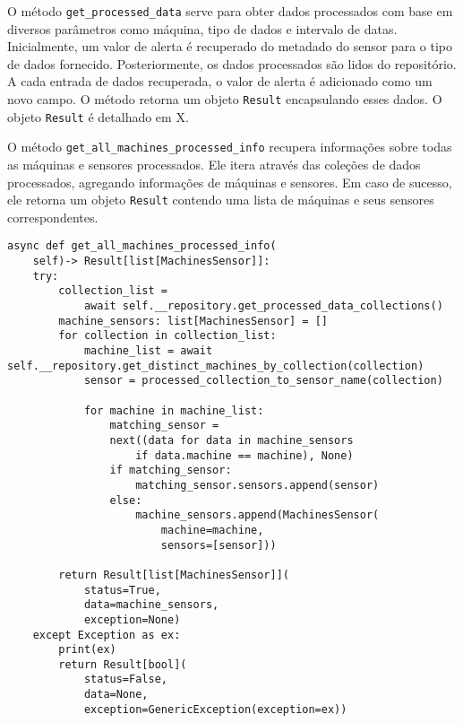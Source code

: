 O método \texttt{get\_processed\_data} serve para obter dados processados com base em diversos parâmetros como máquina, tipo de dados e intervalo de datas. Inicialmente, um valor de alerta é recuperado do metadado do sensor para o tipo de dados fornecido. Posteriormente, os dados processados são lidos do repositório. A cada entrada de dados recuperada, o valor de alerta é adicionado como um novo campo. O método retorna um objeto \texttt{Result} encapsulando esses dados. O objeto \texttt{Result} é detalhado em X. %

O método \texttt{get\_all\_machines\_processed\_info} recupera informações sobre todas as máquinas e sensores processados. Ele itera através das coleções de dados processados, agregando informações de máquinas e sensores. Em caso de sucesso, ele retorna um objeto \texttt{Result} contendo uma lista de máquinas e seus sensores correspondentes.

\begin{verbatim}
async def get_all_machines_processed_info(
    self)-> Result[list[MachinesSensor]]:
    try:
        collection_list = 
            await self.__repository.get_processed_data_collections()
        machine_sensors: list[MachinesSensor] = []
        for collection in collection_list:
            machine_list = await self.__repository.get_distinct_machines_by_collection(collection)
            sensor = processed_collection_to_sensor_name(collection)

            for machine in machine_list:
                matching_sensor = 
                next((data for data in machine_sensors 
                    if data.machine == machine), None)
                if matching_sensor:
                    matching_sensor.sensors.append(sensor)
                else:
                    machine_sensors.append(MachinesSensor(
                        machine=machine,
                        sensors=[sensor]))
        
        return Result[list[MachinesSensor]](
            status=True,
            data=machine_sensors,
            exception=None)
    except Exception as ex:
        print(ex)
        return Result[bool](
            status=False,
            data=None,
            exception=GenericException(exception=ex)) 
\end{verbatim}

